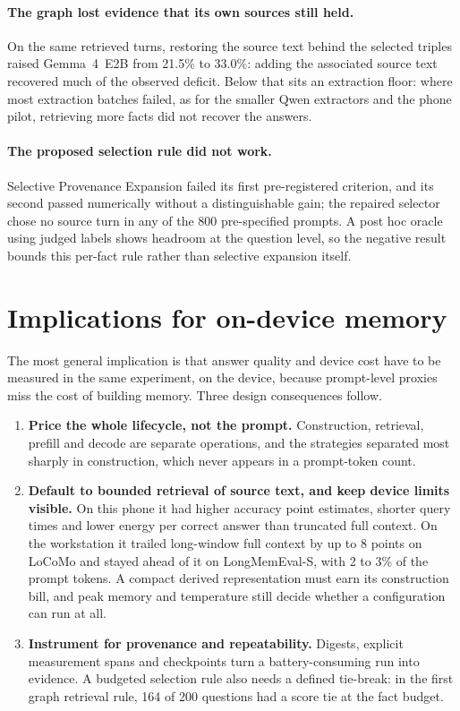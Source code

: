 \paragraph{The graph lost evidence that its own sources still held.}
On the same retrieved turns, restoring the source text behind the selected triples raised Gemma~4~E2B
from 21.5\% to 33.0\%: adding the associated source text recovered much of the observed deficit. Below
that sits an extraction floor: where most
extraction batches failed, as for the smaller Qwen extractors and the phone pilot, retrieving more
facts did not recover the answers.

\paragraph{The proposed selection rule did not work.}
Selective Provenance Expansion failed its first pre-registered criterion, and its second passed
numerically without a distinguishable gain; the repaired selector chose no source turn in any of the
800 pre-specified prompts. A post hoc oracle using judged labels shows headroom at the question
level, so the negative result bounds this per-fact rule rather than selective expansion itself.

\section{Implications for on-device memory}
\label{sec:ch10_implications}

The most general implication is that answer quality and device cost have to be measured in the same
experiment, on the device, because prompt-level proxies miss the cost of building memory. Three design
consequences follow.

\begin{enumerate}
  \item \textbf{Price the whole lifecycle, not the prompt.} Construction, retrieval, prefill and
        decode are separate operations, and the strategies separated most sharply in construction,
        which never appears in a prompt-token count.

  \item \textbf{Default to bounded retrieval of source text, and keep device limits visible.} On
        this phone it had higher accuracy point estimates, shorter query times and lower energy per
        correct answer than truncated full context. On the workstation it trailed long-window full
        context by up to 8 points on LoCoMo and stayed ahead of it on LongMemEval-S, with 2 to 3\% of the
        prompt tokens. A compact derived representation must earn its construction bill, and peak memory and
        temperature still decide whether a configuration can run at all.

  \item \textbf{Instrument for provenance and repeatability.} Digests, explicit measurement spans
        and checkpoints turn a battery-consuming run into evidence. A budgeted selection rule also
        needs a defined tie-break: in the first graph retrieval rule, 164 of 200 questions had a score
        tie at the fact budget.
\end{enumerate}

